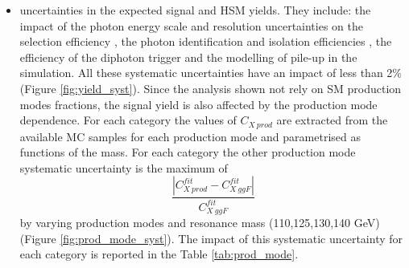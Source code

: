 \documentclass[a4paper, oneside, 11pt, openright]{book}
\begin{document}
\begin{itemize}
 					\begin{table}[tbp]
 						\centering
 						\caption{Signal and HSM $\pm1\sigma$ var Resolution and Scale shape systematic uncertainties for each category}
 						\label{tab:shape}
 					\end{table}
 					\item uncertainties in the expected signal and HSM yields. They include: the impact of the photon energy scale and resolution uncertainties on the selection efficiency \cite{Aad_2019}, the photon identification and isolation efficiencies \cite{Aad_2019}, the efficiency of the diphoton trigger \cite{e_trigger} and the modelling of pile-up in the simulation. All these systematic uncertainties have an impact of less than 2\% (Figure \ref{fig:yield_syst}). Since the analysis shown not rely on SM production modes fractions, the signal yield is also affected by the production mode dependence. For each category the values of $C_{X\ prod}$ are extracted from the available MC samples for each production mode and parametrised as functions of the mass. For each category the other production mode systematic uncertainty is the maximum of  $$\dfrac{|C^{fit}_{X\ prod}-C^{fit}_{X\ ggF}|}{C^{fit}_{X\ ggF}}$$ by varying production modes and resonance mass (110,125,130,140 GeV) (Figure \ref{fig:prod_mode_syst}). The impact of this systematic uncertainty for each category is reported in the Table \ref{tab:prod_mode}.

\end{itemize}
\end{document}
